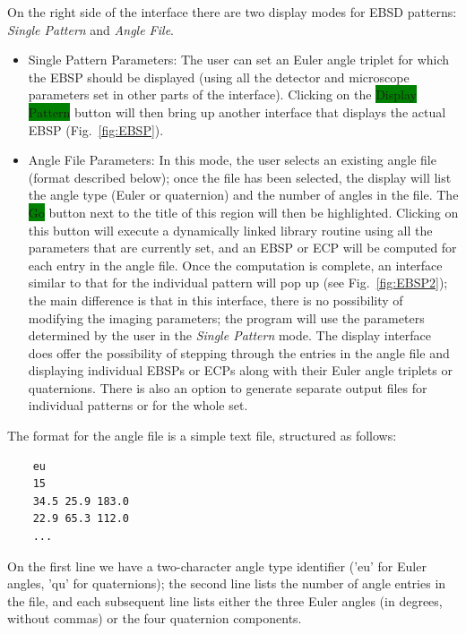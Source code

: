 \documentclass[DIV=calc, paper=letter, fontsize=11pt]{scrartcl}	 %
\newcommand{\ctp}{\textsf{EMsoft}}
\newcommand{\button}[1]{\colorbox{green}{\textsf{#1}} button}
\begin{document}
On the right side of the interface there are two display modes for EBSD patterns: \textit{Single Pattern} and \textit{Angle File}.
\begin{itemize}
	\item \textsf{Single Pattern Parameters}: The user can set an Euler angle triplet for which the EBSP should be displayed (using all the detector and microscope
	parameters set in other parts of the interface).  Clicking on the \button{Display Pattern} will then bring up another interface that 
	displays the actual EBSP (Fig.~\ref{fig:EBSP}).  
	\item \textsf{Angle File Parameters}: In this mode, the user selects an existing angle file (format described below); once the file has been 
	selected, the display will list the angle type (Euler or quaternion) and the number of angles in the file.  The \button{Go} next to the 
	title of this region will then be highlighted.  Clicking on this button will execute a dynamically linked library routine using all the parameters 
	that are currently set, and an EBSP or ECP will be computed for each entry in the angle file.  Once the computation is complete, an interface similar
	to that for the individual pattern will pop up (see Fig.~\ref{fig:EBSP2}); the main difference is that in this interface, there is no possibility of modifying the 
	imaging parameters; the program will use the parameters determined by the user in the \textit{Single Pattern} mode.  The display interface
	does offer the possibility of stepping through the entries in the angle file and displaying individual EBSPs or ECPs along with their Euler angle
	triplets or quaternions.  There is also an option to generate separate output files for individual patterns or for the whole set.  
\end{itemize}


The format for the angle file is a simple text file, structured as follows:
\begin{verbatim}
	eu
	15
	34.5 25.9 183.0
	22.9 65.3 112.0
	...
\end{verbatim}
On the first line we have a two-character angle type identifier ('eu' for Euler angles, 'qu' for quaternions); the second line 
lists the number of angle entries in the file, and each subsequent line lists either the three Euler angles (in degrees, without commas)
or the four quaternion components.
\end{document}
